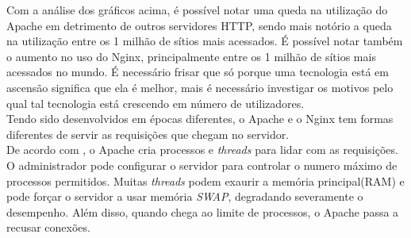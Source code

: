 Com a análise dos gráficos acima, é possível notar uma queda na utilização do Apache em detrimento de outros servidores HTTP, sendo mais notório a queda na utilização entre os 1 milhão de sítios mais acessados. É possível notar também o aumento no uso do Nginx, principalmente entre os 1 milhão de sítios mais acessados no mundo. É necessário frisar que só porque uma tecnologia está em ascensão significa que ela é melhor, mais é necessário investigar os motivos pelo qual tal tecnologia está crescendo em número de utilizadores.\\
Tendo sido desenvolvidos em épocas diferentes, o Apache e o Nginx tem formas diferentes de servir as requisições que chegam no servidor.\\
De acordo com , o Apache cria processos e \textit{threads} para lidar com as requisições. O administrador pode configurar o servidor para controlar o numero máximo de processos permitidos. Muitas \textit{threads} podem exaurir a memória principal(RAM) e pode forçar o servidor a usar memória \textit{SWAP}, degradando severamente o desempenho. Além disso, quando chega ao limite de processos, o Apache passa a recusar conexões.
